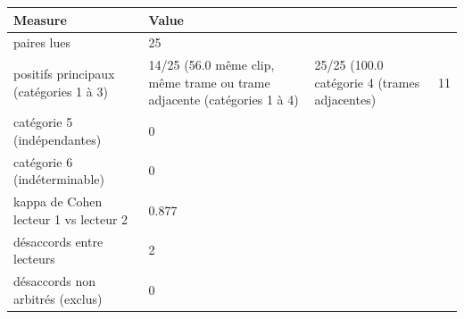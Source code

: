 \begin{tabular}{ll}
\toprule
Measure & Value \\
\midrule
paires lues & 25 \\
positifs principaux (catégories 1 à 3) & 14/25 (56.0 %
même clip, même trame ou trame adjacente (catégories 1 à 4) & 25/25 (100.0 %
catégorie 4 (trames adjacentes) & 11 \\
catégorie 5 (indépendantes) & 0 \\
catégorie 6 (indéterminable) & 0 \\
kappa de Cohen lecteur 1 vs lecteur 2 & 0.877 \\
désaccords entre lecteurs & 2 \\
désaccords non arbitrés (exclus) & 0 \\
\bottomrule
\end{tabular}
